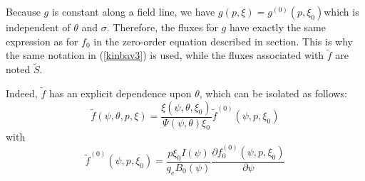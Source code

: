 Because $g$ is constant along a field line, we have $g\left(  p,\xi\right)
=g^{(0)}\left(  p,\xi_{0}\right)  $which is independent of $\theta$ and
$\sigma$. Therefore, the fluxes for $g$ have exactly the same expression as
for $f_{0}$ in the zero-order equation described in section. This is why the
same notation in (\ref{kinbav3}) is used, while the fluxes associated with
$\widetilde{f}$ are noted $\widetilde{S}$.

Indeed, $\widetilde{f}$ has an explicit dependence upon $\theta$, which can be
isolated as follows:
\begin{equation}
\widetilde{f}(\psi,\theta,p,\xi)=\frac{\xi(\psi,\theta,\xi_{0})}{\Psi
(\psi,\theta)\xi_{0}}\widetilde{f}^{(0)}(\psi,p,\xi_{0})\label{ftilde}%
\end{equation}
with
\begin{equation}
\widetilde{f}^{(0)}(\psi,p,\xi_{0})=\frac{p\xi_{0}I\left(  \psi\right)
}{q_{e}B_{0}\left(  \psi\right)  }\frac{\partial f_{0}^{(0)}(\psi,p,\xi_{0}%
)}{\partial\psi}%
\end{equation}

